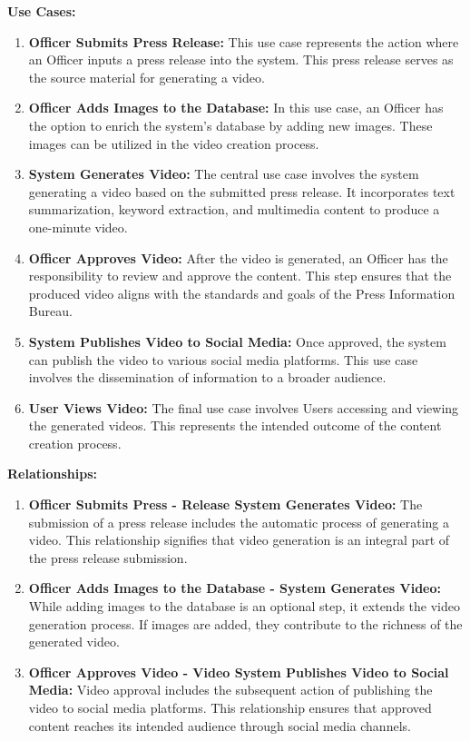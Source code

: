 \documentclass[12pt]{article}
\begin{document}
\textbf{Use Cases:}
\begin{enumerate}
    \item \textbf{Officer Submits Press Release:} This use case represents the action where an Officer inputs a press release into the system. This press release serves as the source material for generating a video.
    \item \textbf{Officer Adds Images to the Database:}  In this use case, an Officer has the option to enrich the system's database by adding new images. These images can be utilized in the video creation process.
    \item \textbf{System Generates Video:} The central use case involves the system generating a video based on the submitted press release. It incorporates text summarization, keyword extraction, and multimedia content to produce a one-minute video.
    \item \textbf{Officer Approves Video:} After the video is generated, an Officer has the responsibility to review and approve the content. This step ensures that the produced video aligns with the standards and goals of the Press Information Bureau.
    \item \textbf{System Publishes Video to Social Media:} Once approved, the system can publish the video to various social media platforms. This use case involves the dissemination of information to a broader audience.
    \item \textbf{User Views Video:} The final use case involves Users accessing and viewing the generated videos. This represents the intended outcome of the content creation process.
\end{enumerate}

\textbf{Relationships:}
\begin{description}

\begin{enumerate}
\item \textbf{Officer Submits Press - Release System Generates Video:} The submission of a press release includes the automatic process of generating a video. This relationship signifies that video generation is an integral part of the press release submission.
\item \textbf{Officer Adds Images to the Database - System Generates Video:}  While adding images to the database is an optional step, it extends the video generation process. If images are added, they contribute to the richness of the generated video.
\item \textbf{Officer Approves Video - Video System Publishes Video to Social Media: } Video approval includes the subsequent action of publishing the video to social media platforms. This relationship ensures that approved content reaches its intended audience through social media channels.

\end{enumerate}
\end{description}
\end{document}
